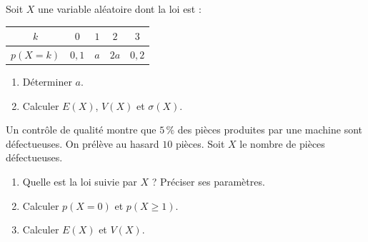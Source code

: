 \begin{exercice}[2]
Soit $X$ une variable al\'{e}atoire dont la loi est :

\begin{center}
\renewcommand{\arraystretch}{1.4}
\begin{tabular}{|c|c|c|c|c|}
  \hline
  \rowcolor{navylight}
  $k$ & $0$ & $1$ & $2$ & $3$ \\
  \hline
  $p(X=k)$ & $0{,}1$ & $a$ & $2a$ & $0{,}2$ \\
  \hline
\end{tabular}
\end{center}

\begin{enumerate}[label=\textbf{\arabic*.}, itemsep=4pt]
  \item D\'{e}terminer $a$.
  \item Calculer $E(X)$, $V(X)$ et $\sigma(X)$.
\end{enumerate}
\end{exercice}

\begin{exercice}[3]
Un contr\^{o}le de qualit\'{e} montre que $5\,\%$ des pi\`{e}ces produites par
une machine sont d\'{e}fectueuses. On pr\'{e}l\`{e}ve au hasard $10$ pi\`{e}ces.
Soit $X$ le nombre de pi\`{e}ces d\'{e}fectueuses.

\begin{enumerate}[label=\textbf{\arabic*.}, itemsep=4pt]
  \item Quelle est la loi suivie par $X$ ? Pr\'{e}ciser ses param\`{e}tres.
  \item Calculer $p(X = 0)$ et $p(X \geq 1)$.
  \item Calculer $E(X)$ et $V(X)$.
\end{enumerate}
\end{exercice}
